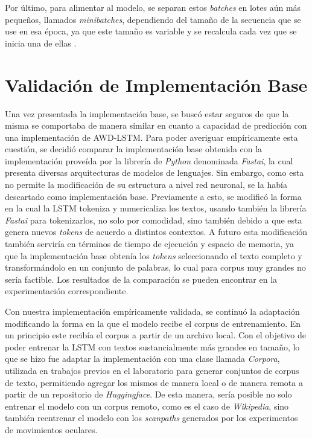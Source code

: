 Por último, para alimentar al modelo, se separan estos \textit{batches} en lotes aún más pequeños, llamados \textit{minibatches}, dependiendo del tamaño de la secuencia que se use en esa época, ya que este tamaño es variable y se recalcula cada vez que se inicia una de ellas \parencite{merity2017regularizingoptimizinglstmlanguage}.

\section{Validación de Implementación Base}

\label{sec:validacion_base}

Una vez presentada la implementación base, se buscó estar seguros de que la misma se comportaba de manera similar en cuanto a capacidad de predicción con una implementación de AWD-LSTM. Para poder averiguar empíricamente esta cuestión, se decidió comparar la implementación base obtenida con la implementación proveída por la librería de \textit{Python} denominada \textit{Fastai}, la cual presenta diversas arquitecturas de modelos de lenguajes. Sin embargo, como esta no permite la modificación de su estructura a nivel red neuronal, se la había descartado como implementación base.
Previamente a esto, se modificó la forma en la cual la LSTM tokeniza y numericaliza los textos, usando también la librería \textit{Fastai} para tokenizarlos, no solo por comodidad, sino también debido a que esta genera nuevos \textit{tokens} de acuerdo a distintos contextos. A futuro esta modificación también serviría en términos de tiempo de ejecución y espacio de memoria, ya que la implementación base obtenía los \textit{tokens} seleccionando el texto completo y transformándolo en un conjunto de palabras, lo cual para corpus muy grandes no sería factible. Los resultados de la comparación se pueden encontrar en la experimentación correspondiente.

Con nuestra implementación empíricamente validada, se continuó la adaptación modificando la forma en la que el modelo recibe el corpus de entrenamiento. En un principio este recibía el corpus a partir de un archivo local. Con el objetivo de poder entrenar la LSTM con textos sustancialmente más grandes en tamaño, lo que se hizo fue adaptar la implementación con una clase llamada \textit{Corpora}, utilizada en trabajos previos en el laboratorio para generar conjuntos de corpus de texto, permitiendo agregar los mismos de manera local o de manera remota a partir de un repositorio de \textit{Huggingface}. De esta manera, sería posible no solo entrenar el modelo con un corpus remoto, como es el caso de \textit{Wikipedia}, sino también reentrenar el modelo con los \textit{scanpaths} generados por los experimentos de movimientos oculares.

